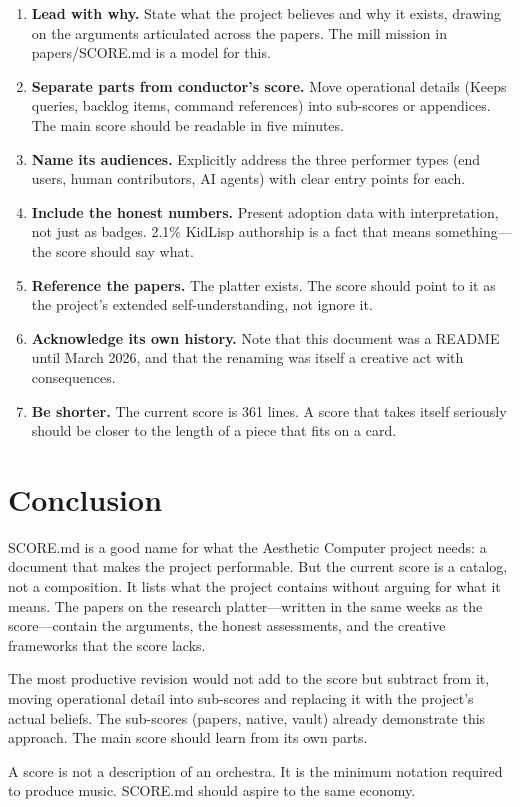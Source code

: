 \documentclass[10pt,letterpaper,twocolumn]{article}
\begin{document}
\begin{enumerate}
\item \textbf{Lead with why.} State what the project believes and why it exists, drawing on the arguments articulated across the papers. The mill mission in papers/SCORE.md is a model for this.
\item \textbf{Separate parts from conductor's score.} Move operational details (Keeps queries, backlog items, command references) into sub-scores or appendices. The main score should be readable in five minutes.
\item \textbf{Name its audiences.} Explicitly address the three performer types (end users, human contributors, AI agents) with clear entry points for each.
\item \textbf{Include the honest numbers.} Present adoption data with interpretation, not just as badges. 2.1\% KidLisp authorship is a fact that means something---the score should say what.
\item \textbf{Reference the papers.} The platter exists. The score should point to it as the project's extended self-understanding, not ignore it.
\item \textbf{Acknowledge its own history.} Note that this document was a README until March 2026, and that the renaming was itself a creative act with consequences.
\item \textbf{Be shorter.} The current score is 361 lines. A score that takes itself seriously should be closer to the length of a piece that fits on a card.
\end{enumerate}

\section{Conclusion}

SCORE.md is a good name for what the Aesthetic Computer project needs: a document that makes the project performable. But the current score is a catalog, not a composition. It lists what the project contains without arguing for what it means. The papers on the research platter---written in the same weeks as the score---contain the arguments, the honest assessments, and the creative frameworks that the score lacks.

The most productive revision would not add to the score but subtract from it, moving operational detail into sub-scores and replacing it with the project's actual beliefs. The sub-scores (papers, native, vault) already demonstrate this approach. The main score should learn from its own parts.

A score is not a description of an orchestra. It is the minimum notation required to produce music. SCORE.md should aspire to the same economy.



\end{document}
